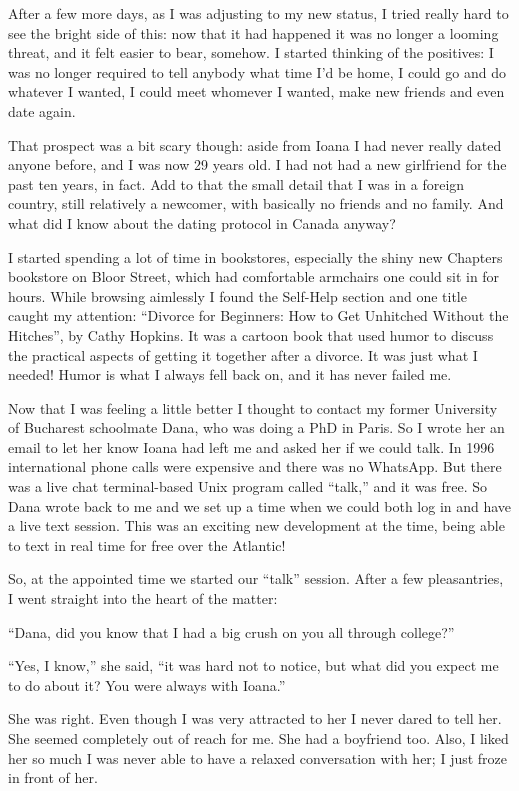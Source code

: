 \documentclass[12pt]{book}
\begin{document}
After a few more days, as I was adjusting to my new status, I tried
really hard to see the bright side of this: now that it had happened it
was no longer a looming threat, and it felt easier to bear, somehow. I
started thinking of the positives: I was no longer required to tell
anybody what time I'd be home, I could go and do whatever I wanted, I
could meet whomever I wanted, make new friends and even date again.

That prospect was a bit scary though: aside from Ioana I had never
really dated anyone before, and I was now 29 years old. I had not had a
new girlfriend for the past ten years, in fact. Add to that the small
detail that I was in a foreign country, still relatively a newcomer,
with basically no friends and no family. And what did I know about the
dating protocol in Canada anyway?

I started spending a lot of time in bookstores, especially the shiny new
Chapters bookstore on Bloor Street, which had comfortable armchairs one
could sit in for hours. While browsing aimlessly I found the Self-Help
section and one title caught my attention: ``Divorce for Beginners: How
to Get Unhitched Without the Hitches'', by Cathy Hopkins. It was a
cartoon book that used humor to discuss the practical aspects of getting
it together after a divorce. It was just what I needed! Humor is what I
always fell back on, and it has never failed me.

Now that I was feeling a little better I thought to contact my former
University of Bucharest schoolmate Dana, who was doing a PhD in Paris.
So I wrote her an email to let her know Ioana had left me and asked her
if we could talk. In 1996 international phone calls were expensive and
there was no WhatsApp. But there was a live chat terminal-based Unix
program called ``talk,'' and it was free. So Dana wrote back to me and
we set up a time when we could both log in and have a live text session.
This was an exciting new development at the time, being able to text in
real time for free over the Atlantic!

So, at the appointed time we started our ``talk'' session. After a few
pleasantries, I went straight into the heart of the matter:

``Dana, did you know that I had a big crush on you all through
college?''

``Yes, I know,'' she said, ``it was hard not to notice, but what did you
expect me to do about it? You were always with Ioana.''

She was right. Even though I was very attracted to her I never dared to
tell her. She seemed completely out of reach for me. She had a boyfriend
too. Also, I liked her so much I was never able to have a relaxed
conversation with her; I just froze in front of her.
\end{document}
